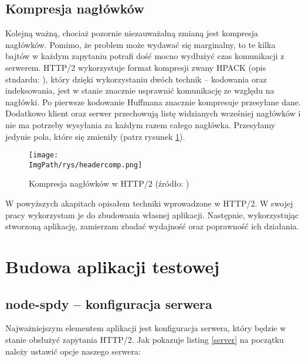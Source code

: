 \documentclass[a4paper,12pt,twoside,openany]{report}
\newcommand{\ImgPath}{.}
\begin{document}
\section{Kompresja nagłówków}

Kolejną ważną, chociaż pozornie niezauważalną zmianą jest kompresja nagłówków.
Pomimo, że problem może wydawać się marginalny, to te kilka bajtów w każdym zapytaniu potrafi dość mocno wydłużyć czas komunikacji z serwerem.
HTTP/2 wykorzystuje format kompresji zwany HPACK (opis stndardu: \cite{hpack}), który dzięki wykorzystaniu dwóch technik -- kodowania oraz indeksowania, jest w stanie znacznie usprawnić komunikację ze względu na nagłówki.
Po pierwsze kodowanie Huffmana znacznie kompresuje przesyłane dane.
Dodatkowo klient oraz serwer przechowują listę widzianych wcześniej nagłówków i nie ma potrzeby wysyłania za każdym razem całego nagłówka.
Przesyłamy jedynie pola, które się zmieniły (patrz rysunek \ref{schematHeaderComp}).

\begin{figure}[!htbp]
	\begin{center}
\centering
\texttt{[image: \\ImgPath/rys/headercomp.png]}
\end{center}
	\caption{Kompresja nagłówków w HTTP/2 (źródło: \cite{http2Fundamentals})}
	\label{schematHeaderComp}
\end{figure}

W powyższych akapitach opisałem techniki wprowadzone w HTTP/2.
W swojej pracy wykorzystam je do zbudowania własnej aplikacji.
Następnie, wykorzystując stworzoną aplikację, zamierzam zbadać wydajność oraz poprawność ich działania. 

\chapter{Budowa aplikacji testowej}

\section{node-spdy -- konfiguracja serwera}

Najważniejszym elementem aplikacji jest konfiguracja serwera, który będzie w stanie obsłużyć zapytania HTTP/2.
Jak pokazuje listing \ref{server} na początku należy ustawić opcje naszego serwera:
\end{document}
